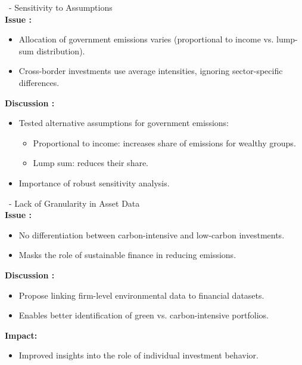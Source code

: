 \documentclass[10pt]{beamer}
\begin{document}
\begin{frame}{\subsecname \  - \subsubsecname}
    Sensitivity to Assumptions \\ 
    \textbf{Issue :}
    \begin{itemize}
        \item Allocation of government emissions varies (proportional to income vs. lump-sum distribution).
        \item Cross-border investments use average intensities, ignoring sector-specific differences.
    \end{itemize}
    \vspace{0.3cm}
    \textbf{Discussion :}
    \begin{itemize}
        \item Tested alternative assumptions for government emissions:
        \begin{itemize}
            \item Proportional to income: increases share of emissions for wealthy groups.
            \item Lump sum: reduces their share.
        \end{itemize}
        \item Importance of robust sensitivity analysis.
    \end{itemize}
\end{frame}

\begin{frame}{\subsecname \  - \subsubsecname}
    Lack of Granularity in Asset Data \\ 
    \textbf{Issue :}
    \begin{itemize}
        \item No differentiation between carbon-intensive and low-carbon investments.
        \item Masks the role of sustainable finance in reducing emissions.
    \end{itemize}
    \vspace{0.3cm}
    \textbf{Discussion :}
    \begin{itemize}
        \item Propose linking firm-level environmental data to financial datasets.
        \item Enables better identification of green vs. carbon-intensive portfolios.
    \end{itemize}
    \vspace{0.3cm}
    \textbf{Impact:}
    \begin{itemize}
        \item Improved insights into the role of individual investment behavior.
    \end{itemize}
\end{frame}
\end{document}
